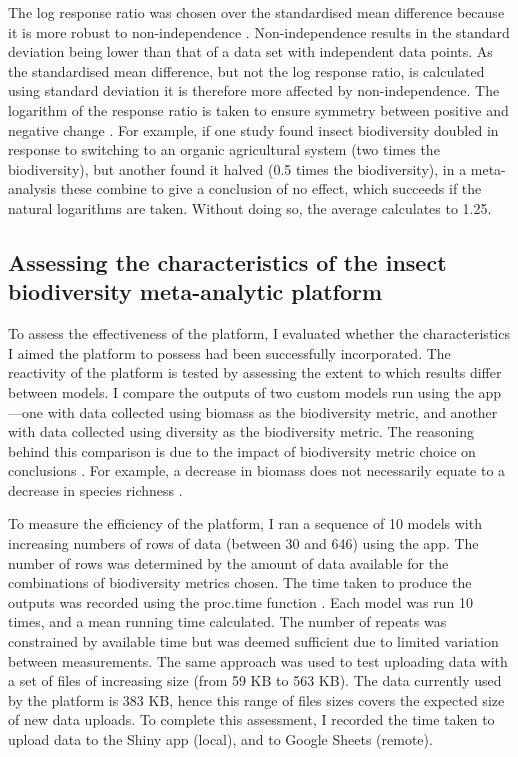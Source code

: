 \documentclass[11pt]{article}
\begin{document}
		\noindent The log response ratio was chosen over the standardised mean difference because it is more robust to non-independence \citep{noble2017nonindependence}. Non-independence results in the standard deviation being lower than that of a data set with independent data points. As the standardised mean difference, but not the log response ratio, is calculated using standard deviation it is therefore more affected by non-independence. The logarithm of the response ratio is taken to ensure symmetry between positive and negative change \citep{hedges1999meta}. For example, if one study found insect biodiversity doubled in response to switching to an organic agricultural system (two times the biodiversity), but another found it halved (0.5 times the biodiversity), in a meta-analysis these combine to give a conclusion of no effect, which succeeds if the natural logarithms are taken. Without doing so, the average calculates to 1.25. 
		
		\subsection{Assessing the characteristics of the insect biodiversity meta-analytic platform }
		To assess the effectiveness of the platform, I evaluated whether the characteristics I aimed the platform to possess had been successfully incorporated. The reactivity of the platform is tested by assessing the extent to which results differ between models. I compare the outputs of two custom models run using the app—one with data collected using biomass as the biodiversity metric, and another with data collected using diversity as the biodiversity metric. The reasoning behind this comparison is due to the impact of biodiversity metric choice on conclusions \citep{hillebrand2018biodiversity}. For example, a decrease in biomass does not necessarily equate to a decrease in species richness \citep{jahnig2021revisiting}. 
		
		\noindent To measure the efficiency of the platform, I ran a sequence of 10 models with increasing numbers of rows of data (between 30 and 646) using the app. The number of rows was determined by the amount of data available for the combinations of biodiversity metrics chosen. The time taken to produce the outputs was recorded using the proc.time function \citep{team2013r}. Each model was run 10 times, and a mean running time calculated. The number of repeats was constrained by available time but was deemed sufficient due to limited variation between measurements. The same approach was used to test uploading data with a set of files of increasing size (from 59 KB to 563 KB). The data currently used by the platform is 383 KB, hence this range of files sizes covers the expected size of new data uploads. To complete this assessment, I recorded the time taken to upload data to the Shiny app (local), and to Google Sheets (remote). 
		
\end{document}
